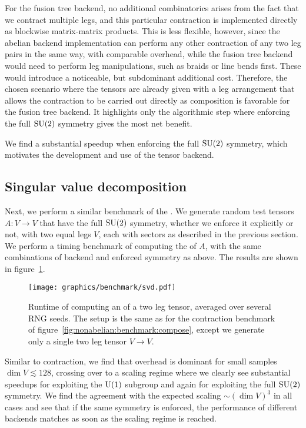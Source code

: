 For the fusion tree backend, no additional combinatorics arises from the fact that we contract multiple legs, and this particular contraction is implemented directly as blockwise matrix-matrix products.
%
This is less flexible, however, since the abelian backend implementation can perform any other contraction of any two leg pairs in the same way, with comparable overhead, while the fusion tree backend would need to perform leg manipulations, such as braids or line bends first.
%
These would introduce a noticeable, but subdominant additional cost.
%
Therefore, the chosen scenario where the tensors are already given with a leg arrangement that allows the contraction to be carried out directly as composition is favorable for the fusion tree backend.
%
It highlights only the algorithmic step where enforcing the full $\mathrm{SU}(2)$ symmetry gives the most net benefit.

We find a substantial speedup when enforcing the full $\mathrm{SU}(2)$ symmetry, which motivates the development and use of the tensor backend.

\subsection{Singular value decomposition}

Next, we perform a similar benchmark of the .
%
We generate random test tensors $A: V \to V$ that have the full $\mathrm{SU}(2)$ symmetry, whether we enforce it explicitly or not, with two equal legs $V$, each with sectors as described in the previous section.
%
We perform a timing benchmark of computing the  of $A$, with the same combinations of backend and enforced symmetry as above.
%
The results are shown in figure~\ref{fig:nonabelian:benchmark:svd}.


\begin{figure}[ht]
    \centering
    \texttt{[image: graphics/benchmark/svd.pdf]}
    \caption[Runtime benchmark for SVD, comparing tensor backends]{
        Runtime of computing an  of a two leg tensor, averaged over several RNG seeds.
        The setup is the same as for the contraction benchmark of figure~\ref{fig:nonabelian:benchmark:compose}, except we generate only a single two leg tensor $V \to V$.
    }
    \label{fig:nonabelian:benchmark:svd}
\end{figure}


Similar to contraction, we find that overhead is dominant for small samples $\dim V \lesssim 128$, crossing over to a scaling regime where we clearly see substantial speedups for exploiting the $\mathrm{U}(1)$ subgroup and again for exploiting the full $\mathrm{SU}(2)$ symmetry.
%
We find the agreement with the expected scaling $\sim (\dim V)^3$ in all cases and see that if the same symmetry is enforced, the performance of different backends matches as soon as the scaling regime is reached.
